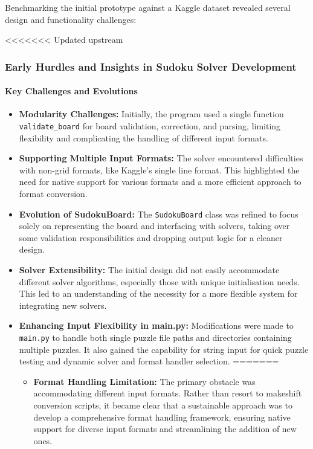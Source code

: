 \documentclass[11pt]{article}
\begin{document}
Benchmarking the initial prototype against a Kaggle dataset revealed several design and functionality challenges:

<<<<<<< Updated upstream
\subsubsection{Early Hurdles and Insights in Sudoku Solver Development}

\paragraph{Key Challenges and Evolutions}
\begin{itemize}
    \item \textbf{Modularity Challenges:} Initially, the program used a single function \texttt{validate\_board} for board validation, correction, and parsing, limiting flexibility and complicating the handling of different input formats.
    
    \item \textbf{Supporting Multiple Input Formats:} The solver encountered difficulties with non-grid formats, like Kaggle's single line format. This highlighted the need for native support for various formats and a more efficient approach to format conversion.

    \item \textbf{Evolution of SudokuBoard:} The \texttt{SudokuBoard} class was refined to focus solely on representing the board and interfacing with solvers, taking over some validation responsibilities and dropping output logic for a cleaner design.

    \item \textbf{Solver Extensibility:} The initial design did not easily accommodate different solver algorithms, especially those with unique initialisation needs. This led to an understanding of the necessity for a more flexible system for integrating new solvers.

    \item \textbf{Enhancing Input Flexibility in main.py:} Modifications were made to \texttt{main.py} to handle both single puzzle file paths and directories containing multiple puzzles. It also gained the capability for string input for quick puzzle testing and dynamic solver and format handler selection.
=======
\begin{itemize}
\item \textbf{Format Handling Limitation:} The primary obstacle was accommodating different input formats. Rather than resort to makeshift conversion scripts, it became clear that a sustainable approach was to develop a comprehensive format handling framework, ensuring native support for diverse input formats and streamlining the addition of new ones.


\end{itemize}
\end{itemize}
\end{document}
